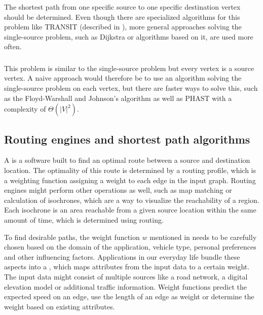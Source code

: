 		\subsubsection{}
		
			The shortest path from one specific source to one specific destination vertex should be determined.
			Even though there are specialized algorithms for this problem like TRANSIT (described in ), more general approaches solving the single-source problem, such as Dijkstra or algorithms based on it, are used more often.
		
		\subsubsection{}
		\label{subsubsec:all-pair-shortest-path}
		
			This problem is similar to the single-source problem but every vertex is a source vertex.
			A naive approach would therefore be to use an algorithm solving the single-source problem on each vertex, but there are faster ways to solve this, such as the Floyd-Warshall and Johnson's algorithm\cite[693,700]{cormen-introduction-to-alg} as well as PHAST\cite{bast-transportation-networks} with a complexity of $\Theta(|V|^2)$.
		
	\subsection{Routing engines and shortest path algorithms}
	\label{subsec:routing-engines}
		
		A  is a software built to find an optimal route between a source and destination location.
		The optimality of this route is determined by a routing profile, which is a weighting function assigning a weight to each edge in the input graph.
		Routing engines might perform other operations as well, such as map matching or calculation of isochrones, which are a way to visualize the reachability of a region\cite{allen-isochrones}.
		Each isochrone is an area reachable from a given source location within the same amount of time, which is determined using routing.
		
		To find desirable paths, the weight function $w$ mentioned in  needs to be carefully chosen based on the domain of the application, vehicle type, personal preferences and other influencing factors.
		Applications in our everyday life bundle these aspects into a , which maps attributes from the input data to a certain weight.
		The input data might consist of multiple sources like a road network, a digital elevation model or additional traffic information.
		Weight functions predict the expected speed on an edge\cite{graphhopper-profile-bike-speeds}, use the length of an edge\cite{graphhopper-profile-shortest} as weight or determine the weight based on existing attributes\cite{graphhopper-profile-short-fastest}.
		
